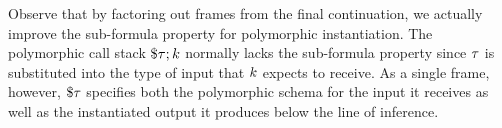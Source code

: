 \documentclass{article}
\begin{document}
\begin{itemize}

\end{itemize}
Observe that by factoring out frames from the final continuation, we actually
improve the sub-formula property for polymorphic instantiation.  The polymorphic
call stack $\${\tau};{k}$ normally lacks the sub-formula property since $\tau$
is substituted into the type of input that $k$ expects to receive.  As a
single frame, however, $\${\tau}$ specifies both the polymorphic schema for
the input it receives as well as the instantiated output it produces below the
line of inference.
\end{document}
